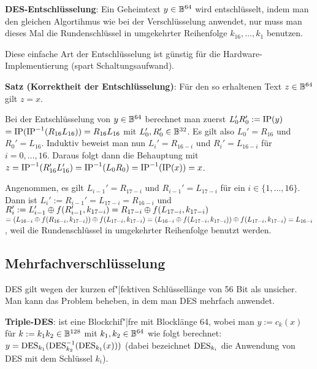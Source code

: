 \linie

\textbf{DES-Entschlüsselung}:
Ein Geheimtext $y \in \mathbb{B}^{64}$ wird entschlüsselt,
indem man den gleichen Algortihmus wie bei der Verschlüsselung anwendet,
nur muss man dieses Mal die Rundenschlüssel in umgekehrter Reihenfolge $k_{16}, \dotsc, k_1$
benutzen.

Diese einfache Art der Entschlüsselung ist günstig für die Hardware-Implementierung
(spart Schaltungsaufwand).

\textbf{Satz (Korrektheit der Entschlüsselung)}:
Für den so erhaltenen Text $z \in \mathbb{B}^{64}$ gilt $z = x$.

\begin{Beweis}
    Bei der Entschlüsselung von $y \in \mathbb{B}^{64}$ berechnet man zuerst
    $L_0' R_0' := \operatorname{IP}(y)$\\
    $= \operatorname{IP}(\operatorname{IP}^{-1}(R_{16} L_{16})) = R_{16} L_{16}$ mit
    $L_0', R_0' \in \mathbb{B}^{32}$.
    Es gilt also $L_0' = R_{16}$ und $R_0' = L_{16}$.
    Induktiv beweist man nun $L_i' = R_{16-i}$ und $R_i' = L_{16-i}$ für $i = 0, \dotsc, 16$.
    Daraus folgt dann die Behauptung mit
    $z = \operatorname{IP}^{-1}(R_{16}' L_{16}') = \operatorname{IP}^{-1}(L_0 R_0) = \operatorname{IP}^{-1}(\operatorname{IP}(x)) = x$.

    Angenommen, es gilt $L_{i-1}' = R_{17-i}$ und $R_{i-1}' = L_{17-i}$ für ein
    $i \in \{1, \dotsc, 16\}$.\\
    Dann ist $L_i' := R_{i-1}' = L_{17-i} = R_{16-i}$ und
    $R_i' := L_{i-1}' \oplus f(R_{i-1}', k_{17-i}) =
    R_{17-i} \oplus f(L_{17-i}, k_{17-i})$\\
    $= (L_{16-i} \oplus f(R_{16-i}, k_{17-i})) \oplus f(L_{17-i}, k_{17-i})
    = (L_{16-i} \oplus f(L_{17-i}, k_{17-i})) \oplus f(L_{17-i}, k_{17-i}) = L_{16-i}$,
    weil die Rundenschlüssel in umgekehrter Reihenfolge benutzt werden.
\end{Beweis}

\pagebreak

\subsection{%
    Mehrfachverschlüsselung%
}

DES gilt wegen der kurzen ef"|fektiven Schlüssellänge von 56 Bit als unsicher.
Man kann das Problem beheben, in dem man DES mehrfach anwendet.

\textbf{Triple-DES}:
 ist eine Blockchif"|fre mit Blocklänge 64, wobei man
$y := c_k(x)$ für $k := k_1 k_2 \in \mathbb{B}^{128}$ mit $k_1, k_2 \in \mathbb{B}^{64}$ wie folgt berechnet:
$y = \operatorname{DES}_{k_1}(\operatorname{DES}^{-1}_{k_2}(\operatorname{DES}_{k_1}(x)))$
(dabei bezeichnet $\operatorname{DES}_{k_i}$ die Anwendung von DES mit dem Schlüssel $k_i$).

